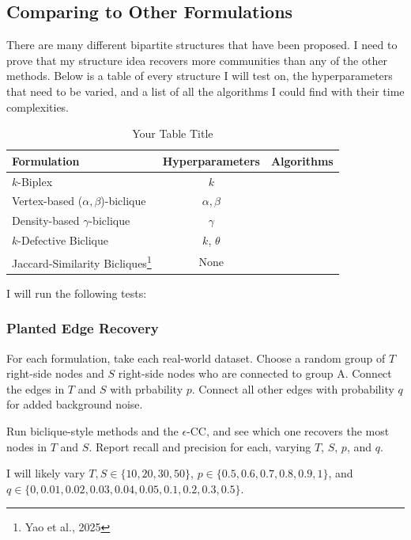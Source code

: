 \documentclass{article}
\begin{document}
\subsection{Comparing to Other Formulations}

There are many different bipartite structures that have been proposed. I need to prove that my structure idea recovers more communities than any of the other methods. Below is a table of every structure I will test on, the hyperparameters that need to be varied, and a list of all the algorithms I could find with their time complexities.

\begin{table}[htbp]
\centering
\caption{Your Table Title}
\label{tab:my_table}

\begin{tabular}{l c r}
\toprule
Formulation & Hyperparameters & Algorithms \\
\midrule
$k$-Biplex & $k$ &   \\
Vertex-based ($\alpha, \beta$)-biclique & $\alpha, \beta$ & \\
Density-based $\gamma$-biclique & $\gamma$ & \\
$k$-Defective Biclique & $k$, $\theta$ & \\
Jaccard-Similarity Bicliques\footnote{Yao et al., 2025} & None & \\
\bottomrule
\end{tabular}

\end{table}

I will run the following tests:

\subsubsection{Planted Edge Recovery}

For each formulation, take each real-world dataset. Choose a random group of $T$ right-side nodes and $S$ right-side nodes who are connected to group A. Connect the edges in $T$ and $S$ with prbability $p$. Connect all other edges with probability $q$ for added background noise.

Run biclique-style methods and the $\epsilon$-CC, and see which one recovers the most nodes in $T$ and $S$. Report recall and precision for each, varying $T$, $S$, $p$, and $q$.

I will likely vary $T, S \in \{10, 20, 30, 50\}$, $p \in \{0.5, 0.6, 0.7, 0.8, 0.9, 1\}$, and $q \in \{0, 0.01, 0.02, 0.03, 0.04, 0.05, 0.1, 0.2, 0.3, 0.5\}$.
\end{document}
